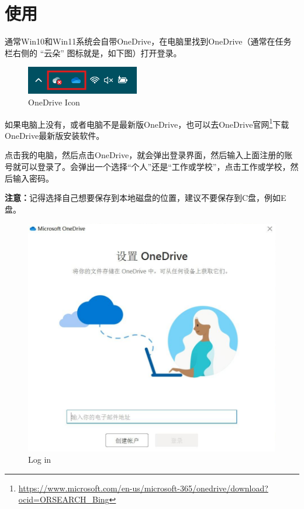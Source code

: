 \documentclass[]{ctexbook}
\renewcommand{\href}[2]{#2\footnote{\url{#1}}}
\theoremstyle{definition}
\theoremstyle{definition}
\theoremstyle{definition}
\theoremstyle{definition}
\theoremstyle{remark}
\begin{document}
\section{使用}\label{ux4f7fux7528}

通常Win10和Win11系统会自带OneDrive，在电脑里找到OneDrive（通常在任务栏右侧的 ``云朵'' 图标就是，如下图）打开登录。

\begin{figure}

{\centering \includegraphics[width=0.9\linewidth]{img/OneDrive/OneDrive_Icon} 

}

\caption{OneDrive Icon}\label{fig:OneDrive-OneDriveIcon}
\end{figure}

如果电脑上没有，或者电脑不是最新版OneDrive，也可以去\href{https://www.microsoft.com/en-us/microsoft-365/onedrive/download?ocid=ORSEARCH_Bing}{OneDrive官网}下载OneDrive最新版安装软件。

点击我的电脑，然后点击OneDrive，就会弹出登录界面，然后输入上面注册的账号就可以登录了。会弹出一个选择``个人''还是``工作或学校''，点击工作或学校，然后输入密码。

\textbf{注意：}记得选择自己想要保存到本地磁盘的位置，建议不要保存到C盘，例如E盘。

\begin{figure}

{\centering \includegraphics[width=1\linewidth]{img/OneDrive/Log_in} 

}

\caption{Log in}\label{fig:OneDrive-LogIn}
\end{figure}
\end{document}
